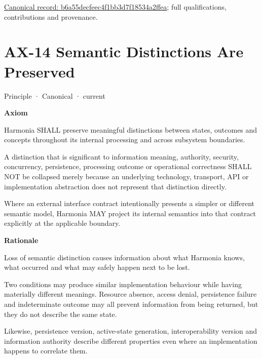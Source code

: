 {\footnotesize \href{../../../../continuum/motivation/principle/b6a55decfeec4f1bb3d7f18534a2ffea.md}{Canonical record: b6a55decfeec4f1bb3d7f18534a2ffea}; full qualifications, contributions and provenance.}\par
\section{AX-14 Semantic Distinctions Are Preserved}

\label{element:d3fc6025dc7646d1b2020b51f7a44bfa}
{\small Principle · Canonical · current}\par

\par\medskip\textbf{Axiom}\par


Harmonia SHALL preserve meaningful distinctions between states, outcomes and concepts throughout its internal processing and across subsystem boundaries.



A distinction that is significant to information meaning, authority, security, concurrency, persistence, processing outcome or operational correctness SHALL NOT be collapsed merely because an underlying technology, transport, API or implementation abstraction does not represent that distinction directly.



Where an external interface contract intentionally presents a simpler or different semantic model, Harmonia MAY project its internal semantics into that contract explicitly at the applicable boundary.



\par\medskip\textbf{Rationale}\par


Loss of semantic distinction causes information about what Harmonia knows, what occurred and what may safely happen next to be lost.



Two conditions may produce similar implementation behaviour while having materially different meanings. Resource absence, access denial, persistence failure and indeterminate outcome may all prevent information from being returned, but they do not describe the same state.



Likewise, persistence version, active-state generation, interoperability version and information authority describe different properties even where an implementation happens to correlate them.



